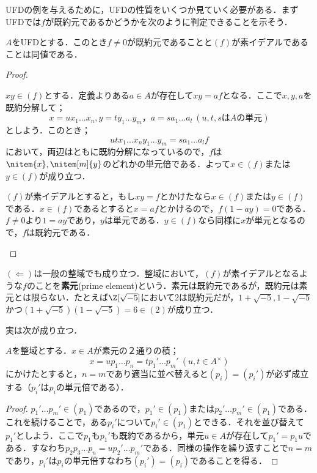UFDの例を与えるために，UFDの性質をいくつか見ていく必要がある．まずUFDでは$f$が既約元であるかどうかを次のように判定できることを示そう．
\begin{prop}
	$A$をUFDとする．このとき$f\neq0$が既約元であることと$(f)$が素イデアルであることは同値である．
\end{prop}
\begin{proof}
	\begin{eqv}
		\item $xy\in(f)$とする．定義よりある$a\in A$が存在して$xy=af$となる．ここで$x,y,a$を既約分解して；
		\[x=ux_1\dots x_n,y=ty_1\dots y_m，a=sa_1\dots a_l~(u,t,s\text{は}A\text{の単元})\]
		としよう．このとき；
		\[utx_1\dots x_ny_1\dots y_m=sa_1\dots a_lf\]
		において，両辺はともに既約分解になっているので，$f$は$\nitem{x},\nitem[m]{y}$のどれかの単元倍である．よって$x\in(f)$または$y\in(f)$が成り立つ．
		
		\item $(f)$が素イデアルとすると，もし$xy=f$とかけたなら$x\in (f)$または$y\in(f)$である．$x\in (f)$であるとすると$x=af$とかけるので，$f(1-ay)=0$である．$f\neq0$より$1=ay$であり，$y$は単元である．$y\in (f)$なら同様に$x$が単元となるので，$f$は既約元である．
	\end{eqv}
\end{proof}

$(\Longleftarrow)$は一般の整域でも成り立つ．整域において，$(f)$が素イデアルとなるような$f$のことを\textbf{素元}(prime element)という．素元は既約元であるが，既約元は素元とは限らない．たとえば$\Z[\sqrt{-5}]$において$2$は既約元だが，$1+\sqrt{-5},1-\sqrt{-5}$かつ$(1+\sqrt{-5})(1-\sqrt{-5})=6\in (2)$が成り立つ．

実は次が成り立つ．
\begin{prop}
	$A$を整域とする．$x\in A$が素元の２通りの積；
	\[x=up_1\dots p_n=tp_1'\dots p_m'~(u,t\in A^\times)\]
	にかけたとすると，$n=m$であり適当に並べ替えると$(p_i)=(p_i')$が必ず成立する（$p_i'$は$p_i$の単元倍である）．
\end{prop}

\begin{proof}
	$p_1'\dots p_m'\in (p_1)$であるので，$p_1'\in (p_1)$または$p_2'\dots p_m'\in (p_1)$である．これを続けることで，ある$p_i'$について$p_i'\in (p_1)$とできる．それを並び替えて$p_1'$としよう．ここで$p_1$も$p_1'$も既約であるから，単元$u\in A$が存在して$p_1'=p_1u$である．すなわち$p_2p_3\dots p_n=up_2'\dots p_m'$である．同様の操作を繰り返すことで$n=m$であり，$p_i'$は$p_i$の単元倍すなわち$(p_i')=(p_i)$であることを得る．
\end{proof}


